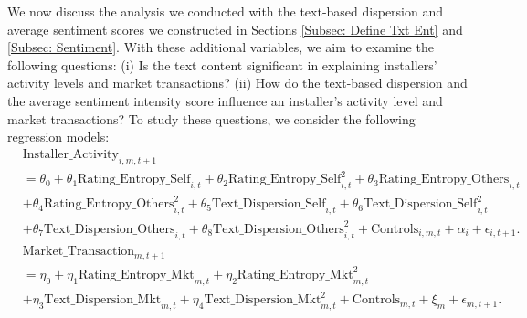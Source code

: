 \documentclass[msom,blindrev]{informs3}
\begin{document}
	We now discuss the analysis we conducted with the text-based dispersion and average sentiment scores we constructed in Sections \ref{Subsec: Define Txt Ent} and \ref{Subsec: Sentiment}. With these additional variables, we aim to examine the following questions: (i) Is the text content significant in explaining installers' activity levels and market transactions? (ii) How do the text-based dispersion and the average sentiment intensity score influence an installer's activity level and market transactions? %
To study these questions, we consider the following regression models:
	\begin{align}  \nonumber
	& \text{Installer\_Activity}_{i,m,t+1} \\ \nonumber
	& = \theta_{0}+ \theta_{1} \text{Rating\_Entropy\_Self}_{i,t}+ \theta_{2} \text{Rating\_Entropy\_Self}_{i,t}^ {2} + \theta_{3} \text{Rating\_Entropy\_Others}_{i,t} \\ \nonumber
	& + \theta_{4} \text{Rating\_Entropy\_Others}_{i,t}^{2} + \theta_{5} \text{Text\_Dispersion\_Self}_{i,t}+  \theta_{6}  \text{Text\_Dispersion\_Self}_{i,t}^ {2}  \\ \label{model_ind_textbased}
	&+ \theta_{7}  \text{Text\_Dispersion\_Others}_{i,t} + \theta_{8} \text{Text\_Dispersion\_Others}_{i,t}^{2}  + \text{Controls}_{i,m,t}+ \alpha_{i} + \epsilon_{i,t+1}.\\ \nonumber
	& \text{Market\_Transaction}_{m,t+1} \\ \nonumber
	& =  \eta_{0} + \eta_{1} \text{Rating\_Entropy\_Mkt}_{m,t}+  \eta_{2} \text{Rating\_Entropy\_Mkt}_{m,t}^2 \\ \label{reg: market-level-textbased}
	&+ \eta_{3} \text{Text\_Dispersion\_Mkt}_{m,t}+ \eta_{4} \text{Text\_Dispersion\_Mkt}_{m,t}^2  + \text{Controls}_{m,t}  + \xi_{m} + \epsilon_{m,t+1}.
	\end{align}
	
\end{document}
